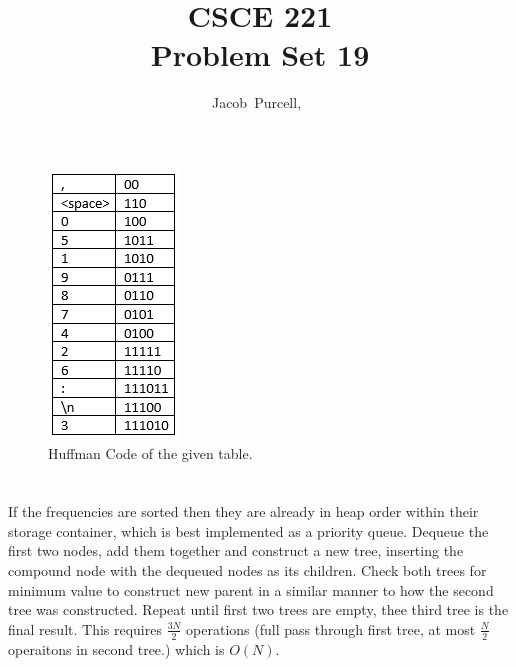 \documentclass[journal]{IEEEtran}
\begin{document}
\title{CSCE 221 \\ Problem Set 19}

\author{Jacob~Purcell,~}

\maketitle
\section{}
\begin{figure}[h!]
    \includegraphics[scale = 1]{Capture.png}
    \caption{Huffman Code of the given table.}
\end{figure}

\section{}
If the frequencies are sorted then they are already in heap order within their storage container, 
which is best implemented as a priority queue. Dequeue the first two nodes, add them together and 
construct a new tree, inserting the compound node with the dequeued nodes as its children. Check both trees
for minimum value to construct new parent in a similar manner to how the second tree was constructed.
 Repeat until first two trees are empty, thee third tree is the final result. This requires $\frac{3N}{2}$
operations (full pass through first tree, at most $\frac{N}{2}$ operaitons in second tree.) which is $\boxed{O(N)}$.
\end{document}
